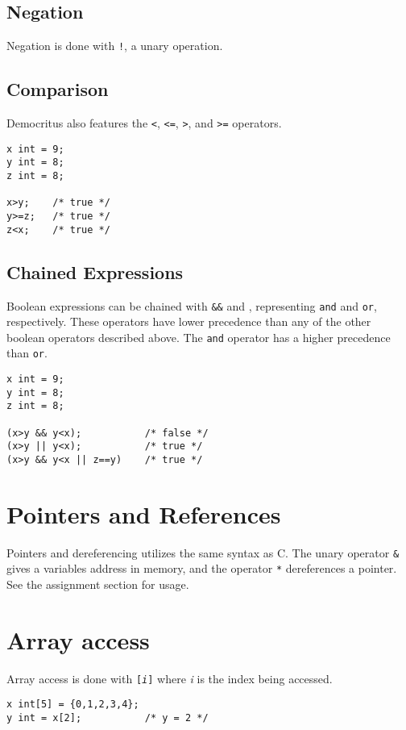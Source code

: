 		\subsection{Negation}
			Negation is done with \texttt{!}, a unary operation.

        \subsection{Comparison}
            Democritus also features the \texttt{\textless}, \texttt{\textless =}, \texttt{\textgreater}, and \texttt{\textgreater =} operators.  
            
            \begin{lstlisting}
x int = 9;
y int = 8;
z int = 8;

x>y;    /* true */
y>=z;   /* true */
z<x;    /* true */
            \end{lstlisting}

        \subsection{Chained Expressions}
            Boolean expressions can be chained with \texttt{\&\&} and \texttt{\textbar\textbar}, representing \texttt{and} and \texttt{or}, respectively. These operators have lower precedence than any of the other boolean operators described above. The \texttt{and} operator has a higher precedence than \texttt{or}.

            \begin{lstlisting}
x int = 9;
y int = 8;
z int = 8;

(x>y && y<x);    		/* false */
(x>y || y<x);  	 		/* true */
(x>y && y<x || z==y)    /* true */
            \end{lstlisting}
            
	\section{Pointers and References}
		Pointers and dereferencing utilizes the same syntax as C. The unary operator \texttt{\&} gives a variables address in memory, and the operator \texttt{*} dereferences a pointer. See the assignment section for usage.
		
	\section{Array access}
		Array access is done with \texttt{[\textit{i}]} where \textit{i} is the index being accessed. 
		
		\begin{lstlisting}
x int[5] = {0,1,2,3,4};
y int = x[2];  			/* y = 2 */
		\end{lstlisting}
		